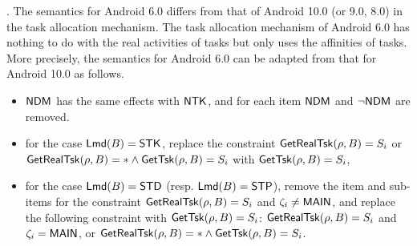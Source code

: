 {%

\smallskip

.
The semantics for Android 6.0 differs from that of Android 10.0 (or 9.0, 8.0) in the task allocation mechanism.  %
The task allocation mechanism of Android 6.0 has nothing to do with the real activities of tasks but only uses the affinities of tasks. More precisely, the semantics for Android 6.0 can be adapted from that for Android 10.0 as follows.
\begin{itemize}
    \item ${\sf NDM}$ has the same effects with ${\sf NTK}$, and for each item ${\sf NDM}$ and $\neg{\sf NDM}$ are removed.
	\item for the case ${\sf Lmd}(B) = {\sf STK}$, replace the constraint $\mathsf{GetRealTsk}(\rho, B) = S_i$ or $\mathsf{GetRealTsk}(\rho, B) = * \wedge \mathsf{GetTsk}(\rho, B) = S_i$ with $\mathsf{GetTsk}(\rho, B) = S_i$,
	\item for the case ${\sf Lmd}(B) = {\sf STD}$ (resp.  ${\sf Lmd}(B) = {\sf STP}$),  remove the item and sub-items for the constraint $\mathsf{GetRealTsk}(\rho, B) = S_i$ and $\zeta_i \neq {\sf MAIN}$, and replace  the following constraint with  $ \mathsf{GetTsk}(\rho, B) = S_i$: $\mathsf{GetRealTsk}(\rho, B) = S_i$ and $\zeta_i = {\sf MAIN}$, or $\mathsf{GetRealTsk}(\rho, B) = * \wedge \mathsf{GetTsk}(\rho, B) = S_i$.
\end{itemize}
}

